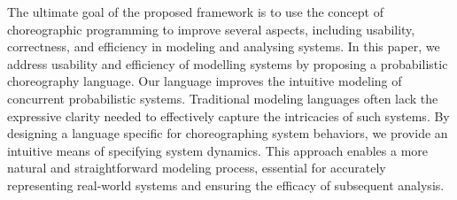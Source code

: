 %
The ultimate goal of the proposed framework is to use the concept of
choreographic programming to improve several aspects, including
usability, correctness, and efficiency in modeling and analysing
systems.
%
In this paper, we address usability and efficiency of modelling
systems by proposing a probabilistic choreography language.
%
%
Our language improves the intuitive modeling of concurrent
probabilistic systems. Traditional modeling languages often lack the
expressive clarity needed to effectively capture the intricacies of
such systems. By designing a language specific for choreographing
system behaviors, we provide an intuitive means of specifying system
dynamics. This approach enables a more natural and straightforward
modeling process, essential for accurately representing real-world
systems and ensuring the efficacy of subsequent analysis.
%

